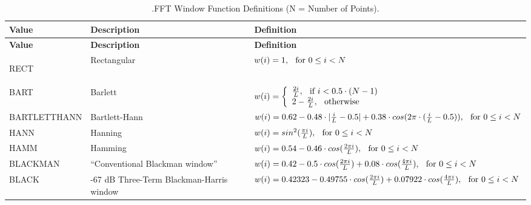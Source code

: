 \begin{longtable}[h] {>{\raggedright\small}m{1.15in}|>{\raggedright\let\\\tabularnewline\small}m{1.35in}
  |>{\raggedright\let\\\tabularnewline\small}m{3.5in}}
  \caption{.FFT Window Function Definitions (N = Number of Points).} \\ \hline
  \rowcolor{XyceDarkBlue}
  \color{white}\bf Value &
  \color{white}\bf Description &
  \color{white}\bf Definition \\ \hline \endfirsthead
  \rowcolor{XyceDarkBlue}
  \color{white}\bf Value &
  \color{white}\bf Description &
  \color{white}\bf Definition \\ \hline \endhead
  \label{FFT_Window_Funcs}

  RECT & Rectangular &
    $w(i)=1, \hspace*{0.1in}\textrm{for}~0 \leq i < N$ \\ \hline
  BART & Barlett~\cite{oppenheimSchafer} &
    $w(i) = \left\{\begin{array}{ll}\frac{2 i}{L},\hspace*{0.1in}\textrm{if}~i < 0.5 \cdot (N-1) \\
                                     2-\frac{2 i}{L},\hspace*{0.1in}\textrm{otherwise}\end{array}\right.$\\ \hline
  BARTLETTHANN & Bartlett-Hann~\cite{Doerry2017}&
    $w(i) = 0.62 - 0.48 \cdot |\frac{i}{L} -0.5| + 0.38 \cdot cos(2 \pi \cdot (\frac{i}{L} -0.5)), \hspace*{0.1in}\textrm{for}~0 \leq i < N $ \\ \hline
  HANN & Hanning~\cite{oppenheimSchafer} &
    $w(i) = sin^2(\frac{\pi i}{L}), \hspace*{0.1in}\textrm{for}~0 \leq i < N$ \\ \hline
  HAMM & Hamming~\cite{oppenheimSchafer} &
    $w(i) = 0.54 - 0.46 \cdot cos(\frac{2 \pi i}{L}), \hspace*{0.1in}\textrm{for}~0 \leq i < N $ \\ \hline
  BLACKMAN & ``Conventional Blackman window''~\cite{Doerry2017} &
    $w(i) = 0.42-0.5 \cdot cos(\frac{2 \pi i}{L})+0.08 \cdot cos(\frac{4 \pi i}{L}), \hspace*{0.1in}\textrm{for}~0 \leq i < N$  \\ \hline
  BLACK & -67 dB Three-Term Blackman-Harris window~\cite{Doerry2017} &
    $w(i) = 0.42323-0.49755 \cdot cos(\frac{2 \pi i}{L})+0.07922 \cdot cos(\frac{4 \pi i}{L}), \hspace*{0.1in}\textrm{for}~0 \leq i < N$  \\ \hline

\end{longtable}

